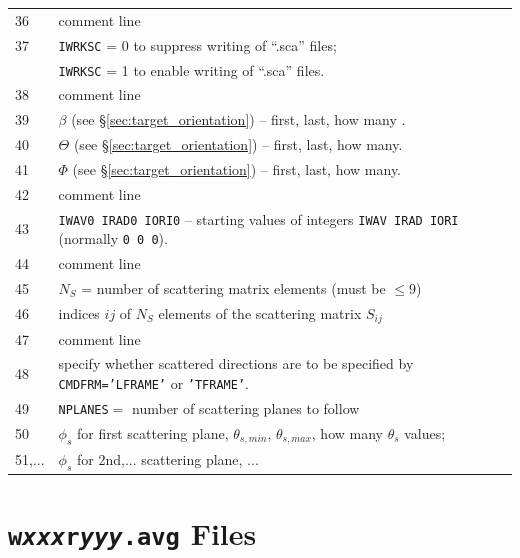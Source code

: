 \begin{appendix}
{\begin{tabular}{l l}
36      &comment line\\
37	&{\tt IWRKSC} = 0 to suppress writing of ``.sca'' files;\\
	&{\tt IWRKSC} = 1 to enable writing of ``.sca'' files.\\
38      &comment line\\
39	&$\beta$ (see \S\ref{sec:target_orientation}) -- first, last, how many .\\
40	&$\Theta$ (see \S\ref{sec:target_orientation}) -- first, last, how many.\\
41	&$\Phi$ (see \S\ref{sec:target_orientation}) -- first, last, how many.\\
42	&comment line\\
43	&{\tt IWAV0 IRAD0 IORI0} -- starting values of integers
	{\tt IWAV IRAD IORI} (normally {\tt 0 0 0}).\\
44	&comment line\\
45	&$N_{S}$ = number of scattering matrix elements (must be $\leq9$)\\
46	&indices $ij$ of $N_S$ elements of the scattering matrix $S_{ij}$\\
47	&comment line\\
48	&specify whether scattered directions are to be
         specified by {\tt CMDFRM='LFRAME'} or {\tt 'TFRAME'}.\\
49      &{\tt NPLANES}$=$ number of scattering planes to follow\\
50	&$\phi_s$ for first scattering plane, $\theta_{s,min}$, 
        $\theta_{s,max}$, how many $\theta_s$ values;\\
51,...	&$\phi_s$ for 2nd,... scattering plane, ...
\end{tabular}
}
\newpage
\section{{\tt w{\it xxx}r{\it yyy}.avg} Files\label{app:w000r000ori.avg}}


\end{appendix}
